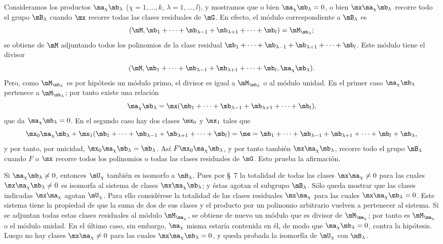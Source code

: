 \documentclass[11pt]{article}
\begin{document}
Consideramos los productos $\ma_\chi\mb_\lambda$ ($\chi=1,\ldots,k$, $\lambda=1,\ldots,l$), y mostramos que o bien $\ma_\chi\mb_\lambda=0$, o bien $\mx\ma_\chi\mb_\lambda$ recorre todo el grupo $\mB_\lambda$ cuando $\mx$ recorre todas las clases residuales de $\mG$. En efecto, el módulo correspondiente a $\mB_\lambda$ es
\[
 (\mM,\mb_1+\cdots+\mb_{\lambda-1}+\mb_{\lambda+1}+\cdots+\mb_l)=\mM_{\mb_\lambda};
\]
se obtiene de $\mM$ adjuntando todos los polinomios de la clase residual $\mb_1+\cdots+\mb_{\lambda-1}+\mb_{\lambda+1}+\cdots+\mb_l$. Este módulo tiene el divisor
\[
 (\mM,\mb_1+\cdots+\mb_{\lambda-1}+\mb_{\lambda+1}+\cdots+\mb_l,
 \ma_\chi\mb_\lambda).
\]
Pero, como $\mM_{\mb_\lambda}$ es por hipótesis un módulo primo, el divisor es igual a $\mM_{\mb_\lambda}$ o al módulo unidad. En el primer caso $\ma_\chi\mb_\lambda$ pertenece a $\mM_{\mb_\lambda}$; por tanto existe una relación
\[
 \ma_\chi\mb_\lambda=\mx(\mb_1+\cdots+\mb_{\lambda-1}+\mb_{\lambda+1}+\cdots+\mb_l),
\]
que da $\ma_\chi\mb_\lambda=0$. En el segundo caso hay dos clases $\mx_0$ y $\mx_1$ tales que
\[
 \mx_0\ma_\chi\mb_\lambda
 +\mx_1(\mb_1+\cdots+\mb_{\lambda-1}+\mb_{\lambda+1}+\cdots+\mb_l)
 =\me=\mb_1+\cdots+\mb_{\lambda-1}+\mb_{\lambda+1}+\cdots+\mb_l+\mb_\lambda,
\]
y por tanto, por unicidad, $\mx_0\ma_\chi\mb_\lambda=\mb_\lambda$. Así $F\mx_0\ma_\chi\mb_\lambda$, y por tanto también $\mx\ma_\chi\mb_\lambda$, recorre todo el grupo $\mB_\lambda$ cuando $F$ o $\mx$ recorre todos los polinomios o todas las clases residuales de $\mG$. Esto prueba la afirmación.

Si $\ma_\chi\mb_\lambda\ne0$, entonces $\mU_\chi$ también es isomorfo a $\mB_\lambda$. Pues por \S~7 la totalidad de todas las clases $\mx\ma_\chi\ne0$ para las cuales $\mx\ma_\chi\mb_\lambda\ne0$ es isomorfa al sistema de clases $\mx\ma_\chi\mb_\lambda$; y éstas agotan el subgrupo $\mB_\lambda$. Sólo queda mostrar que las clases indicadas $\mx\ma_\chi$ agotan $\mU_\chi$. Para ello considérese la totalidad de las clases residuales $\mx\ma_\chi$ para las cuales $\mx\ma_\chi\mb_\lambda=0$. Este sistema tiene la propiedad de que la suma de dos de sus clases y el producto por un polinomio arbitrario vuelven a pertenecer al sistema. Si se adjuntan todas estas clases residuales al módulo $\mM_{\ma_\chi}$, se obtiene de nuevo un módulo que es divisor de $\mM_{\ma_\chi}$; por tanto es $\mM_{\ma_\chi}$ o el módulo unidad. En el último caso, sin embargo, $\ma_\chi$ misma estaría contenida en él, de modo que $\ma_\chi\mb_\lambda=0$, contra la hipótesis. Luego no hay clases $\mx\ma_\chi\ne0$ para las cuales $\mx\ma_\chi\mb_\lambda=0$, y queda probada la isomorfía de $\mU_\chi$ con $\mB_\lambda$.
\end{document}
